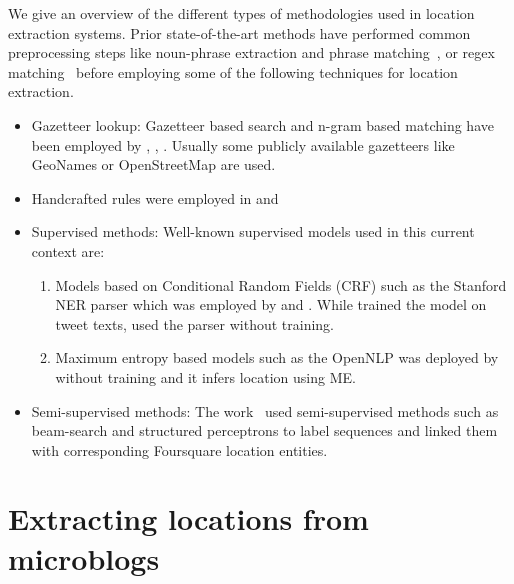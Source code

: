 We give an overview of the different types of methodologies used
in location extraction systems.
Prior state-of-the-art methods have performed common preprocessing steps like noun-phrase extraction and phrase matching~\cite{Malmasi}, or regex matching~\cite{twitie} before employing some of the following techniques for location extraction. 
\begin{itemize}
\item{Gazetteer lookup:}
Gazetteer based search and n-gram based matching have been employed by  \cite{Malmasi}, \cite{middleton} , \cite{gelernter}. Usually some publicly available gazetteers like GeoNames or OpenStreetMap are used.

\item{Handcrafted rules} were employed in \cite{Malmasi} and \cite{gelernter}

\item{Supervised methods:}
Well-known supervised models used in this current context are:
\begin{enumerate}
\item{Models based on Conditional Random Fields (CRF)} such as the Stanford NER parser which was employed by \cite{gelernter} and \cite{Malmasi}. While \cite{gelernter} trained the model on tweet texts, \cite{Malmasi} used the parser without training.
\item{Maximum entropy based models} such as the OpenNLP was deployed by \cite{lingad} without training and it infers location using ME.
\end{enumerate}

\item{Semi-supervised methods:}
The work~\cite{ji2016joint} used semi-supervised methods such as beam-search and structured perceptrons to label sequences and linked them with corresponding Foursquare location entities. 

\end{itemize}






\section{Extracting locations from microblogs}

